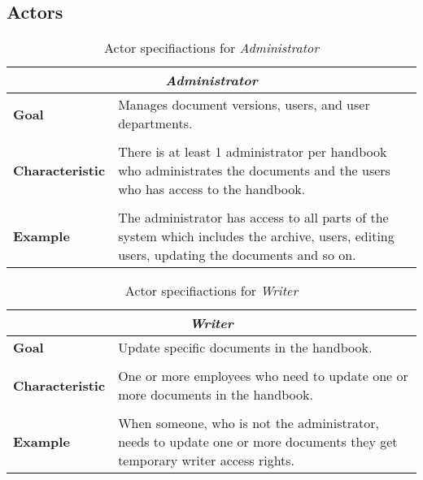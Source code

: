 \subsection{Actors}\label{sec:Actors}
\begin{table}[H]
	\begin{tabular}{l m{11.3cm}}
		\hline
		\multicolumn{2}{c}{\textbf{\textit{Administrator}}}\\
		\hline
		\textbf{Goal} &  Manages document versions, users, and user departments. \\
		 &  \\
		\textbf{Characteristic} & There is at least 1 administrator per handbook who administrates the documents and the users who has access to the handbook. \\
		 &  \\
		\textbf{Example} & The administrator has access to all parts of the system which includes the archive, users, editing users, updating the documents and so on. \\
		\hline
	\end{tabular}
\caption{Actor specifiactions for \textit{Administrator}}\label{tab:Actor-admin}
\end{table}

\begin{table}[H]
	\begin{tabular}{l m{11.3cm}}
		\hline
		\multicolumn{2}{c}{\textbf{\textit{Writer}}}\\
		\hline
		\textbf{Goal} & Update specific documents in the handbook. \\
	 	 &  \\
		\textbf{Characteristic} &  One or more employees who need to update one or more documents in the handbook. \\
		 &  \\
		\textbf{Example} & When someone, who is not the administrator, needs to update one or more documents they get temporary writer access rights.\\
		\hline
	\end{tabular}
	\caption{Actor specifiactions for \textit{Writer}}\label{tab:Actor-write}
\end{table}

